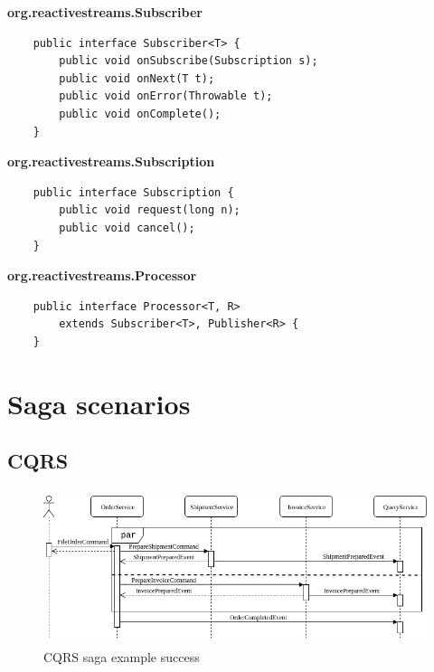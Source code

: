 \documentclass[oneside,
  digital, %
  table,   %
  lof,     %
  lot,     %
]{fithesis3}
\begin{document}
\noindent
\textbf{org.reactivestreams.Subscriber}

\begin{verbatim}
    public interface Subscriber<T> {
        public void onSubscribe(Subscription s);
        public void onNext(T t);
        public void onError(Throwable t);
        public void onComplete();
    }
\end{verbatim}

\noindent
\textbf{org.reactivestreams.Subscription}

\begin{verbatim}
    public interface Subscription {
        public void request(long n);
        public void cancel();
    }
\end{verbatim}

\noindent
\textbf{org.reactivestreams.Processor}

\begin{verbatim}
    public interface Processor<T, R> 
        extends Subscriber<T>, Publisher<R> {
    }
\end{verbatim}


\clearpage
\chapter{Saga scenarios}
\label{sec:appendix-scenarios}

\section{CQRS}

\begin{figure}[h]
    \begin{center}
        \includegraphics[height=45mm]{images/sequence/validSagaCQRS.png}
    \end{center}
    \caption{CQRS saga example success}
\end{figure}

\hfill \break
\end{document}
